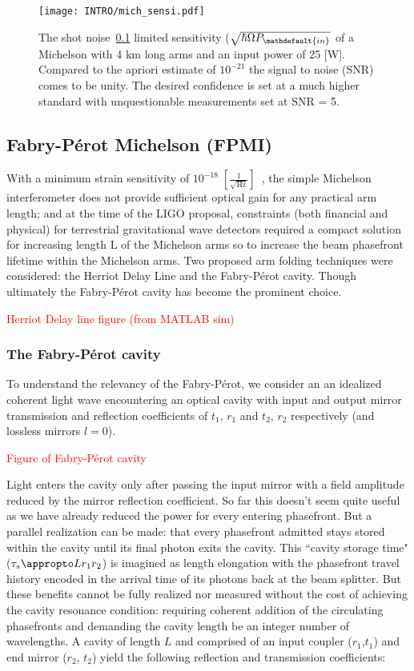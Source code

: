 \begin{figure}[ht!]
	\centering
	\texttt{[image: INTRO/mich\_sensi.pdf]}
	\caption{The shot noise~\ref{} limited sensitivity ($\sqrt{\hbar \Omega P_\mathdefault{in}}$ of a Michelson with 4 km long arms and an input power of 25 [W]. Compared to the apriori estimate of $10^{-21}$ the signal to noise (SNR) comes to be unity. The desired confidence is set at a much higher standard with unquestionable measurements set at SNR = 5.}
	\label{fig:mich}
\end{figure}

\subsection{Fabry-P\'{e}rot Michelson (FPMI)}
With a minimum strain sensitivity of $10^{-18} \; [\frac{1}{\sqrt{\mathrm{Hz}}}]$~\cite{}, the simple Michelson interferometer does not provide sufficient optical gain for any practical arm length; and at the time of the LIGO proposal, constraints (both financial and physical) for terrestrial gravitational wave detectors required a compact solution for increasing length L of the Michelson arms so to increase the beam phasefront lifetime within the Michelson arms. Two proposed arm folding techniques were considered: the Herriot Delay Line and the Fabry-P\'{e}rot cavity. Though ultimately the Fabry-P\'{e}rot cavity has become the prominent choice.

\textcolor{red}{Herriot Delay line figure (from MATLAB sim)}


\subsubsection{The Fabry-P\'{e}rot cavity}
\label{section:FPC}
To understand the relevancy of the Fabry-P\'{e}rot, we consider an an idealized coherent light wave encountering an optical cavity with input and output mirror transmission and reflection coefficients of $t_1$, $r_1$ and $t_2$, $r_2$ respectively (and lossless mirrors $l=0$).

\textcolor{red}{Figure of Fabry-P\'{e}rot cavity}


Light enters the cavity only after passing the input mirror with a field amplitude reduced by the mirror reflection coefficient. So far this doesn't seem quite useful as we have already reduced the power for every entering phasefront. But a parallel realization can be made: that every phasefront admitted stays stored within the cavity until its final photon exits the cavity. This ``cavity storage time" ($\tau_s \appropto L r_1r_2$) is imagined as length elongation with the phasefront travel history encoded in the arrival time of its photons back at the beam splitter. But these benefits cannot be fully realized nor measured without the cost of achieving the cavity resonance condition: requiring coherent addition of the circulating phasefronts and demanding the cavity length be an integer number of wavelengths. A cavity of length $L$ and comprised of an input coupler ($r_1$,$t_1$) and end mirror ($r_2$, $t_2$) yield the following reflection and transmission coefficients: 

